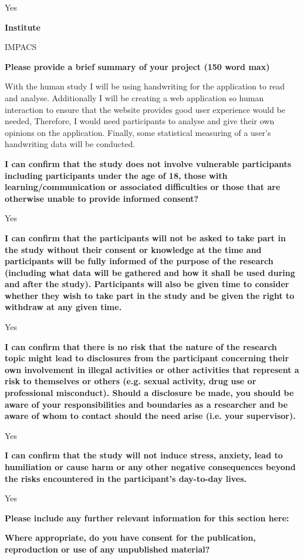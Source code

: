 Yes

\textbf{Institute}

IMPACS

\textbf{Please provide a brief summary of your project (150 word max)}

With the human study I will be using handwriting for the application to read and analyse. Additionally I will be creating a web application so human interaction to ensure that the website provides good user experience would be needed, Therefore, I would need participants to analyse and give their own opinions on the application. Finally, some statistical measuring of a user's handwriting data will be conducted.

\textbf{I can confirm that the study does not involve vulnerable participants including participants under the age of 18, those with learning/communication or associated difficulties or those that are otherwise unable to provide informed consent?}

Yes

\textbf{I can confirm that the participants will not be asked to take part in the study without their consent or knowledge at the time and participants will be fully informed of the purpose of the research (including what data will be gathered and how it shall be used during and after the study). Participants will also be given time to consider whether they wish to take part in the study and be given the right to withdraw at any given time.}

Yes

\textbf{I can confirm that there is no risk that the nature of the research topic might lead to disclosures from the participant concerning their own involvement in illegal activities or other activities that represent a risk to themselves or others (e.g. sexual activity, drug use or professional misconduct). Should a disclosure be made, you should be aware of your responsibilities and boundaries as a researcher and be aware of whom to contact should the need arise (i.e. your supervisor).}

 Yes

\textbf{I can confirm that the study will not induce stress, anxiety, lead to humiliation or cause harm or any other negative consequences beyond the risks encountered in the participant’s day-to-day lives.}

Yes

\textbf{Please include any further relevant information for this section here:}

\textbf{Where appropriate, do you have consent for the publication, reproduction or use of any unpublished material?}

